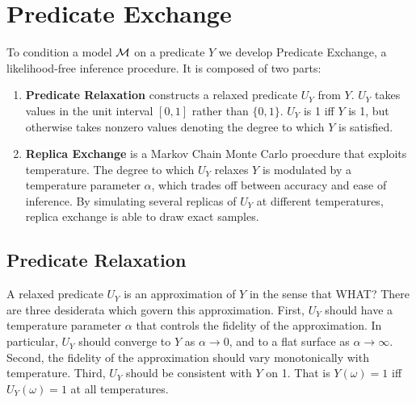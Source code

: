 \section{Predicate Exchange}
To condition a model ${\mathcal{M}}$ on a predicate $Y$ we develop Predicate Exchange, a likelihood-free inference procedure.  It is composed of two parts:
\begin{enumerate}
\item \textbf{Predicate Relaxation} constructs a relaxed predicate $U_Y$ from $Y$. $U_Y$ takes values in the unit interval $[0, 1]$ rather than $\{0, 1\}$.
$U_Y$ is 1 iff $Y$ is 1, but otherwise takes nonzero values denoting the degree to which $Y$ is satisfied.
\item  \textbf{Replica Exchange} is a Markov Chain Monte Carlo proecdure that exploits temperature. The degree to which $U_Y$ relaxes $Y$ is modulated by a temperature parameter $\alpha$, which trades off between accuracy and ease of inference.  By simulating several replicas of $U_Y$ at different temperatures, replica exchange is able to draw exact samples. 
\end{enumerate}

\subsection{Predicate Relaxation}

A relaxed predicate $U_Y$ is an approximation of $Y$ in the sense that WHAT?
There are three desiderata which govern this approximation.
First, $U_Y$ should have a temperature parameter $\alpha$ that controls the fidelity of the approximation. In particular, $U_Y$ should converge to $Y$ as $\alpha \to 0$, and to a flat surface as $\alpha \to \infty$. Second, the fidelity of the approximation should vary monotonically with temperature. Third, $U_Y$ should be consistent with $Y$ on 1. That is $Y(\omega) = 1$ iff $U_Y(\omega) = 1$ at all temperatures.  



